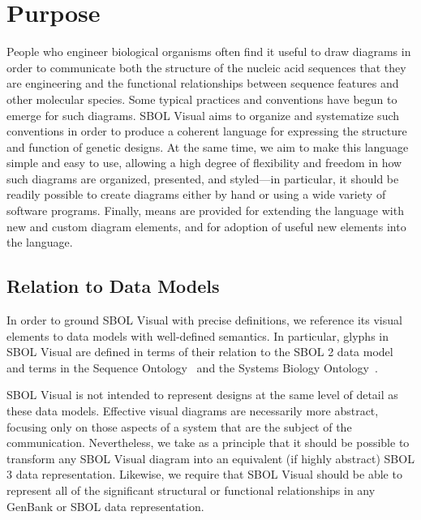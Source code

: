\section{Purpose}

People who engineer biological organisms often find it useful to draw diagrams in order to
communicate both the structure of the nucleic acid sequences that they are engineering
and the functional relationships between sequence features and other molecular species.
%
Some typical practices and conventions have begun to emerge for such
diagrams.  SBOL Visual aims to organize and systematize such
conventions in order to produce a coherent language for expressing
the structure and function 
of genetic designs. 
%
At the same time, we aim to make this language simple and easy to use,
allowing a high degree of flexibility and freedom in how such diagrams are organized, presented, and
styled---in particular, it should be readily possible to create
diagrams either by hand or using a wide variety of software programs.
%
Finally, means are provided for extending the language with new and
custom diagram elements, and for adoption of useful new elements into
the language.

\subsection{Relation to Data Models}

In order to ground SBOL Visual with precise definitions, we reference its visual elements to data models with well-defined semantics.
In particular, glyphs in SBOL Visual are defined in terms of their relation to the SBOL 2 data model~\citep{SBOL3_0} and terms in the Sequence Ontology~\citep{SequenceOntology} and
the Systems Biology Ontology~\citep{SBO}.

SBOL Visual is not intended to represent designs at the same level of detail as these data models.
Effective visual diagrams are necessarily more abstract, focusing only on those aspects of a system that are the subject of the communication.
Nevertheless, we take as a principle that it should be possible to transform any SBOL Visual diagram into an equivalent (if highly abstract) SBOL 3 data representation.
Likewise, we require that SBOL Visual should be able to represent all of the significant structural or functional relationships in any GenBank or SBOL data representation.
